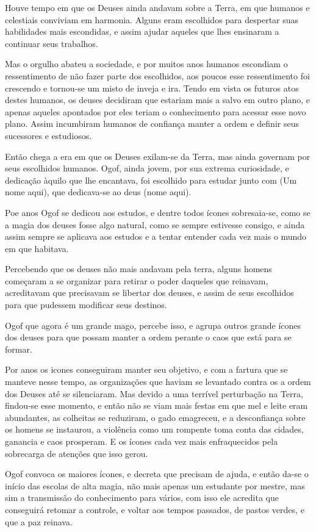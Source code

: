 Houve tempo em que os Deuses ainda andavam sobre a Terra, em que humanos e celestiais conviviam em harmonia. Alguns eram escolhidos para despertar suas habilidades mais escondidas, e assim ajudar aqueles que lhes ensinaram a continuar seus trabalhos. 

Mas o orgulho abateu a sociedade, e por muitos anos humanos escondiam o ressentimento de não fazer parte dos escolhidos, aos poucos esse ressentimento foi crescendo e tornou-se um misto de inveja e ira. Tendo em vista os futuros atos destes humanos, os deuses decidiram que estariam mais a salvo em outro plano, e apenas aqueles apontados por eles teriam o conhecimento para acessar esse novo plano. Assim incumbiram humanos de confiança manter a ordem e definir seus sucessores e estudiosos. 

Então chega a era em que os Deuses exilam-se da Terra, mas ainda governam por seus escolhidos humanos. Ogof, ainda jovem, por sua extrema curiosidade, e dedicação àquilo que lhe encantava, foi escolhido para estudar junto com (Um nome aqui), que dedicava-se ao deus (nome aqui). 

Poe anos Ogof se dedicou aos estudos, e dentre todos ícones sobresaia-se, como se a magia dos deuses fosse algo natural, como se sempre estivesse consigo, e ainda assim sempre se aplicava aos estudos e a tentar entender cada vez mais o mundo em que habitava.

Percebendo que os deuses não mais andavam pela terra, alguns homens começaram a se organizar para retirar o poder daqueles que reinavam, acreditavam que precisavam se libertar dos deuses, e assim de seus escolhidos para que pudessem modificar seus destinos.

Ogof que agora é um grande mago, percebe isso, e agrupa outros grande ícones dos deuses para que possam manter a ordem perante o caos que está para se formar.

Por anos os icones conseguiram manter seu objetivo, e com a fartura que se manteve nesse tempo, as organizações que haviam se levantado contra os a ordem dos Deuses até se silenciaram. Mas devido a uma terrível perturbação na Terra, findou-se esse momento, e então não se viam mais festas em que mel e leite eram abundantes, as colheitas se reduziram, o gado emagreceu, e a desconfiança sobre os homens se instaurou, a violência como um rompente toma conta das cidades, ganancia e caos prosperam. E os ícones cada vez mais enfraquecidos pela sobrecarga de atenções que isso gerou.

Ogof convoca os maiores ícones, e decreta que precisam de ajuda, e então da-se o início das escolas de alta magia, não mais apenas um estudante por mestre, mas sim a transmissão do conhecimento para vários, com isso ele acredita que conseguirá retomar a controle, e voltar aos tempos passados, de pastos verdes, e que a paz reinava.

